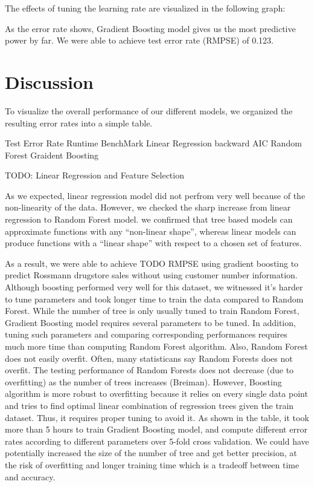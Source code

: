 \documentclass[letterpaper,twocolumn,10pt]{article}
\begin{document}
The effects of tuning the learning rate are visualized in the following graph:


As the error rate shows, Gradient Boosting model gives us the most predictive power by far. We were able to achieve test error rate (RMPSE) of 0.123.



\section{Discussion}
To visualize the overall performance of our different models, we organized the resulting error rates into a simple table. 

                    Test Error Rate    Runtime
BenchMark
Linear Regression
  backward
  AIC
Random Forest
Graident Boosting

TODO: Linear Regression and Feature Selection 


As we expected, linear regression model did not perfrom very well because of the non-linearity of the data. However, we checked the sharp increase from linear regression to Random Forest model. we confirmed that tree based models can approximate functions with any ``non-linear shape'', whereas linear models can produce functions with a ``linear shape'' with respect to a chosen set of features. 

As a result, we were able to achieve TODO RMPSE using gradient boosting to predict Rossmann drugstore sales without using customer number information. Although boosting performed very well for this dataset, we witnessed it's harder to tune parameters and took longer time to train the data compared to Random Forest. While the number of tree is only usually tuned to train Random Forest, Gradient Boosting model requires several parameters to be tuned. In addition, tuning such parameters and comparing corresponding performances requires much more time than computing Random Forest algorithm. Also, Random Forest does not easily overfit. Often, many statisticans say Random Forests does not overfit. The testing performance of Random Forests does not decrease (due to overfitting) as the number of trees increases (Breiman). However, Boosting algorithm is more robust to overfitting because it relies on every single data point and tries to find optimal linear combination of regression trees given the train dataset. Thus, it requires proper tuning to avoid it. As shown in the table, it took more than 5 hours to train Gradient Boosting model, and compute different error rates according to different parameters over 5-fold cross validation. We could have potentially increased the size of the number of tree and get better precision, at the risk of overfitting and longer training time which is a tradeoff between time and accuracy.
\end{document}
